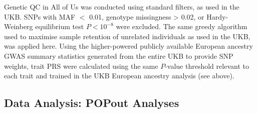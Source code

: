 \documentclass[12pt]{zHenriquesLab-StyleBioRxiv}
\begin{document}
{{Genetic QC in All of Us was conducted using standard filters, as used in 
the UKB.  SNPs with MAF $<$ 0.01, genotype missingness > 0.02, or Hardy-Weinberg 
equilibrium test $P < 10^{-8}$ were excluded. The same greedy algorithm used to maximise sample 
retention of unrelated individuals as used in the UKB, was applied here. Using the higher-powered 
publicly available European ancestry GWAS summary statistics generated from the entire UKB \cite{neale} to provide SNP weights, 
trait PRS were calculated \cite{prsice} using the same $P$-value threshold relevant 
to each trait and trained in the UKB European ancestry analysis (see above). 
























\vspace*{0.3cm} 
\subsection*{Data Analysis: POPout Analyses} \label{sec:methods:popout} 
}}
\end{document}
